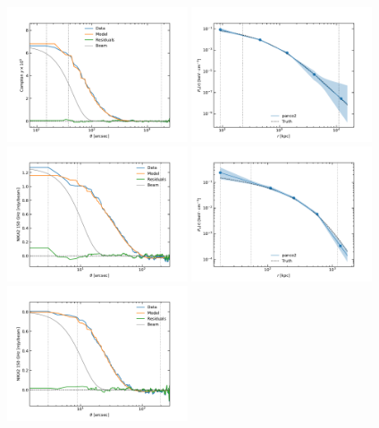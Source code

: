 \begin{figure}[tp]
    \includegraphics[height=4cm, trim={0.5cm 0.3cm 1.3cm 1.3cm}, clip]{../validation/results/C2/SPT/data_model_residuals_profiles.pdf}
    \includegraphics[height=4cm, trim={0.5cm 0.3cm 1.3cm 1.3cm}, clip]{../validation/results/C2/SPT/pressure_profile.pdf} \\
    \includegraphics[height=4cm, trim={0.5cm 0.3cm 1.3cm 1.3cm}, clip]{../validation/results/C2/NIKA2/data_model_residuals_profiles.pdf}
    \includegraphics[height=4cm, trim={0.5cm 0.3cm 1.3cm 1.3cm}, clip]{../validation/results/C2/NIKA2/pressure_profile.pdf} \\
    \includegraphics[height=4cm, trim={0.5cm 0.3cm 1.3cm 1.3cm}, clip]{../validation/results/C3/NIKA2/data_model_residuals_profiles.pdf}

\end{figure}
